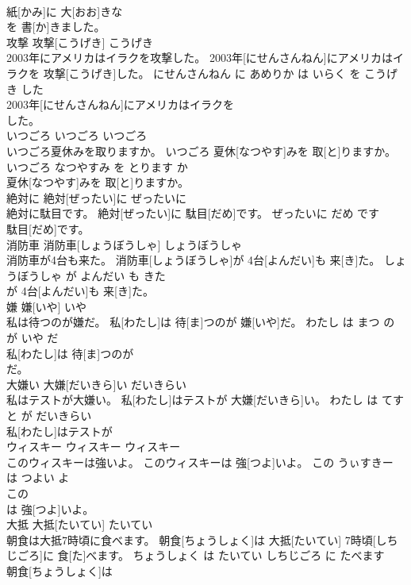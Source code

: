 \documentclass[8pt]{extreport}
\begin{document}
\begin{CJK}{UTF8}{min}
\\	紙[かみ]に 大[おお]きな
\\	を 書[か]きました。			
\\	攻撃	攻撃[こうげき]	こうげき	
\\	2003年にアメリカはイラクを攻撃した。	2003年[にせんさんねん]にアメリカはイラクを 攻撃[こうげき]した。	にせんさんねん に あめりか は いらく を こうげき した	
\\	2003年[にせんさんねん]にアメリカはイラクを
\\	した。			
\\	いつごろ	いつごろ	いつごろ	
\\	いつごろ夏休みを取りますか。	いつごろ 夏休[なつやす]みを 取[と]りますか。	いつごろ なつやすみ を とります か	
\\	夏休[なつやす]みを 取[と]りますか。			
\\	絶対に	絶対[ぜったい]に	ぜったいに	
\\	絶対に駄目です。	絶対[ぜったい]に 駄目[だめ]です。	ぜったいに だめ です	
\\	駄目[だめ]です。			
\\	消防車	消防車[しょうぼうしゃ]	しょうぼうしゃ	
\\	消防車が4台も来た。	消防車[しょうぼうしゃ]が 4台[よんだい]も 来[き]た。	しょうぼうしゃ が よんだい も きた	
\\	が 4台[よんだい]も 来[き]た。			
\\	嫌	嫌[いや]	いや	
\\	私は待つのが嫌だ。	私[わたし]は 待[ま]つのが 嫌[いや]だ。	わたし は まつ の が いや だ	
\\	私[わたし]は 待[ま]つのが
\\	だ。			
\\	大嫌い	大嫌[だいきら]い	だいきらい	
\\	私はテストが大嫌い。	私[わたし]はテストが 大嫌[だいきら]い。	わたし は てすと が だいきらい	
\\	私[わたし]はテストが
\\	ウィスキー	ウィスキー	ウィスキー	
\\	このウィスキーは強いよ。	このウィスキーは 強[つよ]いよ。	この うぃすきー は つよい よ	
\\	この
\\	は 強[つよ]いよ。			
\\	大抵	大抵[たいてい]	たいてい	
\\	朝食は大抵7時頃に食べます。	朝食[ちょうしょく]は 大抵[たいてい] 7時頃[しちじごろ]に 食[た]べます。	ちょうしょく は たいてい しちじごろ に たべます	
\\	朝食[ちょうしょく]は

\end{CJK}
\end{document}
